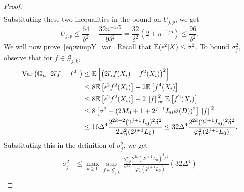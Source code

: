 \begin{proof}
\begin{align*}
\end{align*}
Substituting these two inequalities in the bound on $U_{j,p}$, we get
\begin{equation}\label{eq:TjBoundUjp}
U_{j,p} \le \frac{64}{\delta^2} + \frac{32n^{-1/5}}{9\delta^2} = \frac{32}{\delta^2}\left(2 + n^{-1/5}\right) \le \frac{96}{\delta^2}.
\end{equation}
We will now prove~\eqref{eq:wimpY_var}. Recall that $\mathbb{E}(\epsilon^2|X)\le \sigma^2$. To bound $\sigma_j^2$, observe that for $f\in\mathcal{G}_{j,k}$,
\begin{align*}
\mbox{Var}\left(\mathbb{G}_n\left[2\bar\epsilon f - f^2\right]\right) &\le \mathbb{E}\left[\left(2\bar\epsilon_{i}f(X_i) - f^2(X_i)\right)^2\right]\\ &\le 8\mathbb{E}\left[\bar\epsilon ^2f^2(X_i)\right] + 2\mathbb{E}\left[f^4(X_i)\right]\\
&\le 8\mathbb{E}\left[\epsilon^2f^2(X_i)\right] + 2\norm{f}_{\infty}^2\mathbb{E}\left[f^2(X_i)\right]\\
&\le 8\left[\sigma^2 + (2M_0 + 1 + 2^{j+1}L_0\diameter(D))^2\right]\norm{f}^2\\ &\le 16\Delta^4\frac{2^{2k+2}(2^{j+1}L_0)^2\delta^2}{2\varphi_n^2(2^{j+1}L_0)} \le 32\Delta^4\frac{2^{2k}(2^{j+1}L_0)^2\delta^2}{\varphi_n^2(2^{j+1}L_0)}. 
\end{align*}
Substituting this in the definition of $\sigma_j^2$, we get
\begin{equation*}%
\begin{split}
\sigma_j^2 &\le \max_{k \ge 0}\sup_{f\in\mathcal{G}_{j,k}}\,\frac{\gamma_{j,\delta}^2}{2^{4k}}\frac{2^{2k}(2^{j+1}L_0)^2\delta^2}{\varphi_n^2(2^{j+1}L_0)}(32\Delta^4)\\

\end{split}
\end{equation*}
\end{proof}
